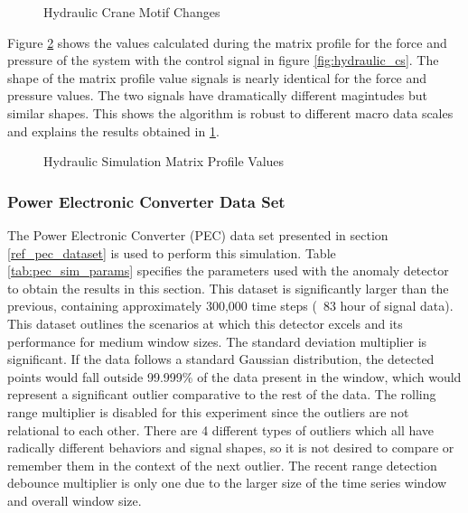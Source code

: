 \begin{figure}[H]
    
    \caption{Hydraulic Crane Motif Changes}
    \label{fig:hydraulic_result_fp}
\end{figure}

Figure \ref{fig:hydraulic_mp_hist_fp} shows the values calculated during the matrix profile for the force and pressure of the system with the control signal in figure \ref{fig:hydraulic_cs}. The shape of the matrix profile value signals is nearly identical for the force and pressure values. The two signals have dramatically different magintudes but similar shapes. This shows the algorithm is robust to different macro data scales and explains the results obtained in \ref{fig:hydraulic_result_fp}.
\begin{figure}[H]
    
    \caption{Hydraulic Simulation Matrix Profile Values}
    \label{fig:hydraulic_mp_hist_fp}
\end{figure}


\subsubsection{Power Electronic Converter Data Set}
\label{ref_results_pec_sim}
The Power Electronic Converter (PEC) data set presented in section \ref{ref_pec_dataset} is used to perform this simulation. Table \ref{tab:pec_sim_params} specifies the parameters used with the anomaly detector to obtain the results in this section. This dataset is significantly larger than the previous, containing approximately 300,000 time steps (~83 hour of signal data). This dataset outlines the scenarios at which this detector excels and its performance for medium window sizes. The standard deviation multiplier is significant. If the data follows a standard Gaussian distribution, the detected points would fall outside 99.999\% of the data present in the window, which would represent a significant outlier comparative to the rest of the data. The rolling range multiplier is disabled for this experiment since the outliers are not relational to each other. There are 4 different types of outliers which all have radically different behaviors and signal shapes, so it is not desired to compare or remember them in the context of the next outlier. The recent range detection debounce multiplier is only one due to the larger size of the time series window and overall window size.

